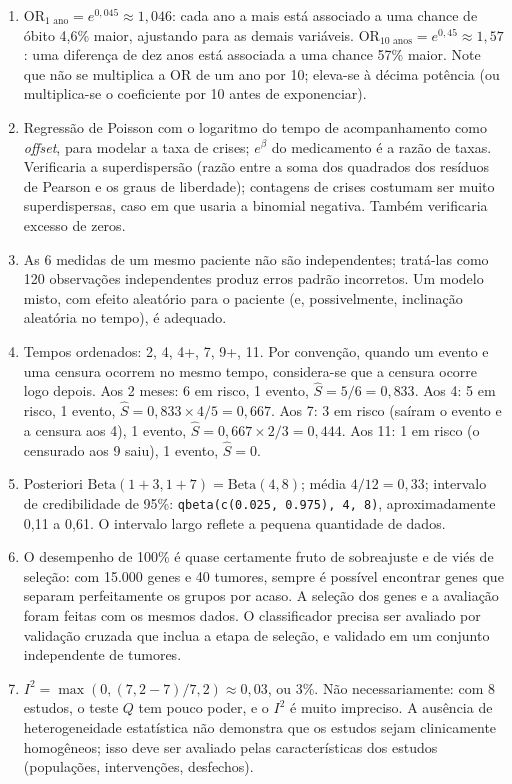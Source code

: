 \documentclass[
]{book}
\begin{document}
\begin{enumerate}
\def\labelenumi{\arabic{enumi}.}
\item
  \(\text{OR}_{1\text{ ano}} = e^{0{,}045} \approx 1{,}046\): cada ano a mais está associado a uma chance de óbito 4,6\% maior, ajustando para as demais variáveis. \(\text{OR}_{10\text{ anos}} = e^{0{,}45} \approx 1{,}57\): uma diferença de dez anos está associada a uma chance 57\% maior. Note que não se multiplica a OR de um ano por 10; eleva-se à décima potência (ou multiplica-se o coeficiente por 10 antes de exponenciar).
\item
  Regressão de Poisson com o logaritmo do tempo de acompanhamento como \emph{offset}, para modelar a taxa de crises; \(e^{\beta}\) do medicamento é a razão de taxas. Verificaria a superdispersão (razão entre a soma dos quadrados dos resíduos de Pearson e os graus de liberdade); contagens de crises costumam ser muito superdispersas, caso em que usaria a binomial negativa. Também verificaria excesso de zeros.
\item
  As 6 medidas de um mesmo paciente não são independentes; tratá-las como 120 observações independentes produz erros padrão incorretos. Um modelo misto, com efeito aleatório para o paciente (e, possivelmente, inclinação aleatória no tempo), é adequado.
\item
  Tempos ordenados: 2, 4, 4+, 7, 9+, 11. Por convenção, quando um evento e uma censura ocorrem no mesmo tempo, considera-se que a censura ocorre logo depois. Aos 2 meses: 6 em risco, 1 evento, \(\hat{S} = 5/6 = 0{,}833\). Aos 4: 5 em risco, 1 evento, \(\hat{S} = 0{,}833 \times 4/5 = 0{,}667\). Aos 7: 3 em risco (saíram o evento e a censura aos 4), 1 evento, \(\hat{S} = 0{,}667 \times 2/3 = 0{,}444\). Aos 11: 1 em risco (o censurado aos 9 saiu), 1 evento, \(\hat{S} = 0\).
\item
  Posteriori \(\text{Beta}(1 + 3, 1 + 7) = \text{Beta}(4, 8)\); média \(4/12 = 0{,}33\); intervalo de credibilidade de 95\%: \texttt{qbeta(c(0.025,\ 0.975),\ 4,\ 8)}, aproximadamente 0,11 a 0,61. O intervalo largo reflete a pequena quantidade de dados.
\item
  O desempenho de 100\% é quase certamente fruto de sobreajuste e de viés de seleção: com 15.000 genes e 40 tumores, sempre é possível encontrar genes que separam perfeitamente os grupos por acaso. A seleção dos genes e a avaliação foram feitas com os mesmos dados. O classificador precisa ser avaliado por validação cruzada que inclua a etapa de seleção, e validado em um conjunto independente de tumores.
\item
  \(I^2 = \max(0, (7{,}2 - 7)/7{,}2) \approx 0{,}03\), ou 3\%. Não necessariamente: com 8 estudos, o teste \(Q\) tem pouco poder, e o \(I^2\) é muito impreciso. A ausência de heterogeneidade estatística não demonstra que os estudos sejam clinicamente homogêneos; isso deve ser avaliado pelas características dos estudos (populações, intervenções, desfechos).
\end{enumerate}
\end{document}
